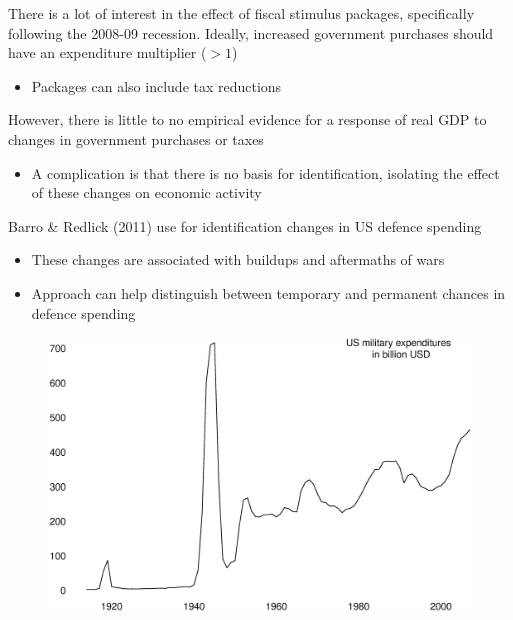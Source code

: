 \documentclass{beamer}
\begin{document}
\begin{frame}
 There is a lot of interest in the effect of fiscal stimulus packages, specifically following the 2008-09 recession. 
 Ideally, increased government purchases should have an expenditure multiplier ($>1$)
 \begin{itemize}
   \item Packages can also include tax reductions
 \end{itemize}
 \medskip
 However, there is little to no empirical evidence for a response of real GDP to changes in government purchases or taxes
 \begin{itemize}
   \item A complication is that there is no basis for identification, isolating the effect of these changes on economic activity
 \end{itemize}
\end{frame}

\begin{frame}
  Barro \& Redlick (2011) use for identification changes in US defence spending
  \begin{itemize}
    \item These changes are associated with buildups and aftermaths of wars
    \item Approach can help distinguish between temporary and permanent chances in defence spending
  \end{itemize}
\end{frame}

\begin{frame}
  \begin{figure}
    \includegraphics[scale=.3]{us_milexp.eps}
  \end{figure}
\end{frame}
\end{document}
